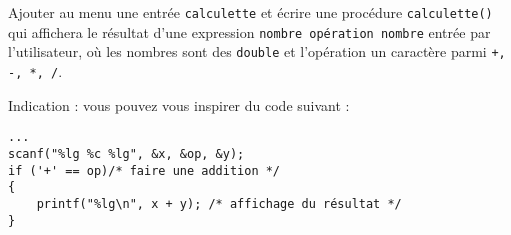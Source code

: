 \begin{lastenu}
\item Ajouter au menu une entrée \verb|calculette| et écrire une 
procédure \verb|calculette()| qui affichera le résultat d'une 
expression \verb|nombre opération nombre| entrée par l'utilisateur, où les nombres
sont des \verb|double| et l'opération un caractère parmi
\verb|+, -, *, /|.  

Indication : vous pouvez vous inspirer du code suivant :
{\footnotesize
\begin{verbatim}
...
scanf("%lg %c %lg", &x, &op, &y);
if ('+' == op)/* faire une addition */
{
    printf("%lg\n", x + y); /* affichage du résultat */
}
\end{verbatim}
}
\end{lastenu}

